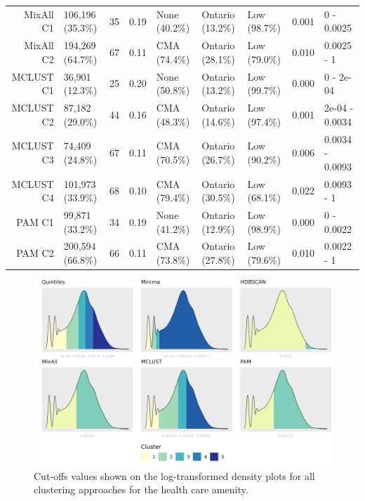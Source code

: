 \documentclass[11pt, a4paper]{article}
\begin{document}
\begin{table}[H]
{\begin{tabular}{|r|llllllll|}
  MixAll C1 & 106,196 (35.3\%) & 35 & 0.19 & None (40.2\%) & Ontario (13.2\%) & Low (98.7\%) & 0.001 & 0 - 0.0025 \\
  MixAll C2 & 194,269 (64.7\%) & 67 & 0.11 & CMA (74.4\%) & Ontario (28.1\%) & Low (79.0\%) & 0.010 & 0.0025 - 1 \\
\rowcolor{gray!25}  MCLUST C1 & 36,901 (12.3\%) & 25 & 0.20 & None (50.8\%) & Ontario (13.2\%) & Low (99.7\%) & 0.000 & 0 - 2e-04 \\
\rowcolor{gray!25}  MCLUST C2 & 87,182 (29.0\%) & 44 & 0.16 & CMA (48.3\%) & Ontario (14.6\%) & Low (97.4\%) & 0.001 & 2e-04 - 0.0034 \\
 \rowcolor{gray!25} MCLUST C3 & 74,409 (24.8\%) & 67 & 0.11 & CMA (70.5\%) & Ontario (26.7\%) & Low (90.2\%) & 0.006 & 0.0034 - 0.0093 \\
 \rowcolor{gray!25} MCLUST C4 & 101,973 (33.9\%) & 68 & 0.10 & CMA (79.4\%) & Ontario (30.5\%) & Low (68.1\%) & 0.022 & 0.0093 - 1 \\
  PAM C1 & 99,871 (33.2\%) & 34 & 0.19 & None (41.2\%) & Ontario (12.9\%) & Low (98.9\%) & 0.000 & 0 - 0.0022 \\
  PAM C2 & 200,594 (66.8\%) & 66 & 0.11 & CMA (73.8\%) & Ontario (27.8\%) & Low (79.6\%) & 0.010 & 0.0022 - 1 \\
   \hline
\end{tabular}
}
\end{table}





\begin{figure}[H]
\centering
\includegraphics[width=\textwidth]{./cutoffs/by_amenity/Health care_cutoffs.png}
\caption[Health care cutoffs]{Cut-offs values shown on the log-transformed density plots for all clustering approaches for the health care amenity.}\label{healthcarecutoffs}
\end{figure}
\end{document}

